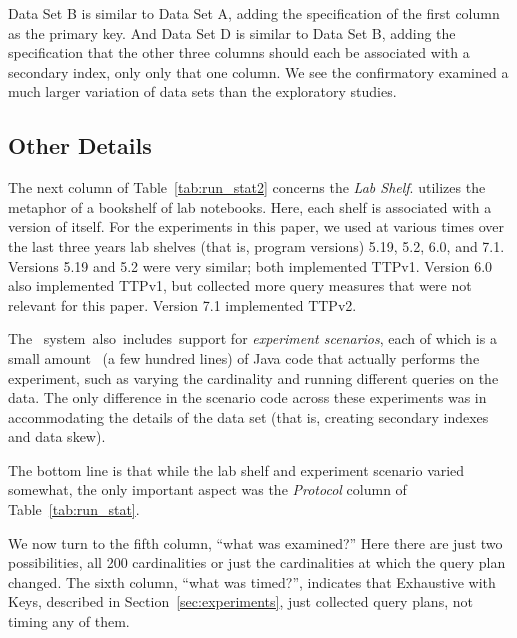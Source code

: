 \documentclass[prodmode,acmtods]{acmsmall}
\def\azdb{\doubleblind{\hbox{\sc AZDBLab}}{\hbox{\sc DBLab}}}
\begin{document}
Data Set B is similar to Data Set A, adding the specification of the first
column as the primary key. And Data Set D is similar to Data Set B, adding
the specification that the other three columns should each be associated
with a secondary index, only only that one column.
We see the confirmatory examined a much larger variation of data sets than
the exploratory studies.

\subsection{Other Details}\label{sec:otherdetails}
The next column of Table~\ref{tab:run_stat2} concerns the {\em Lab
  Shelf}. \hbox{\azdb} utilizes the metaphor of a bookshelf of lab
notebooks. Here, each shelf is associated with a version of \hbox{\azdb} itself. For the experiments in this paper, we used at various times over
the last three years lab shelves (that is, program versions) 5.19, 5.2,
6.0, and 7.1. Versions 5.19 and 5.2 were very similar; both implemented
TTPv1.  Version 6.0 also implemented TTPv1, but collected more query
measures that were not relevant for this paper. Version 7.1 implemented
TTPv2.

The \hbox{\azdb\ system also includes support} for {\em experiment
  scenarios}, each of which
is a small amount~ (a few hundred lines) of Java code that actually performs the experiment, such as varying the
cardinality and running different queries on the data. The only difference
in the scenario code across these experiments was in accommodating the
details of the data set (that is, creating secondary indexes and data skew).

The bottom line is that while the lab shelf and experiment scenario varied
somewhat, the only important aspect was the {\em Protocol} column of
Table~\ref{tab:run_stat}.

We now turn to the fifth column, ``what was examined?'' Here there are just two
possibilities, all 200 cardinalities or just the cardinalities at which the
query plan changed. The sixth column, ``what was timed?'', indicates that Exhaustive with Keys,
described in Section~\ref{sec:experiments}, just
collected query plans, not timing any of them.
\end{document}

